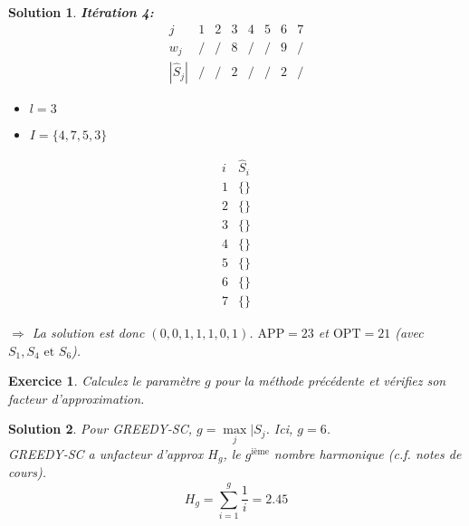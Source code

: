 \documentclass[a4paper,11pt]{report}
\newcommand{\algo}[1]{\textsc{#1}}
\newtheorem{exercice}{Exercice}
\newtheorem{solution}{Solution}
\begin{document}
\begin{solution}
\noindent\textbf{Itération 4:}
$$
\begin{array}{c|ccccccc}
j               & 1 & 2 & 3 & 4 & 5 & 6 & 7\\
\hline
w_j             & / & / & 8 & / & / & 9 & /\\
|\widehat{S}_j| & / & / & 2 & / & / & 2 & /
\end{array}
$$

\begin{itemize}
\item $l = 3$
\item $I = \{4, 7, 5, 3\}$
\end{itemize}

$$
\begin{array}{c|c}
i & \widehat{S}_i\\
\hline
1 & \{\} \\
2 & \{\} \\
3 & \{\} \\
4 & \{\} \\
5 & \{\} \\
6 & \{\} \\
7 & \{\}
\end{array}
$$

\noindent $\Rightarrow$ La solution est donc $(0, 0, 1, 1, 1, 0, 1)$.
$\text{APP} = 23$ et $\text{OPT} = 21$ (avec $S_1, S_4 \text{ et } S_6$).

\end{solution}

\begin{exercice}
Calculez le paramètre $g$ pour la méthode précédente et vérifiez son facteur
d'approximation.
\end{exercice}

\begin{solution}
Pour \algo{GREEDY-SC}, $g = \max\limits_{j}{|S_j}$. Ici, $g=6$.\\

\algo{GREEDY-SC} a unfacteur d'approx $H_g$, le $g^\text{ième}$ nombre
harmonique (c.f. notes de cours).
$$
H_g = \sum\limits_{i=1}^{g}{\frac{1}{i}} = 2.45
$$
\end{solution}
\end{document}
